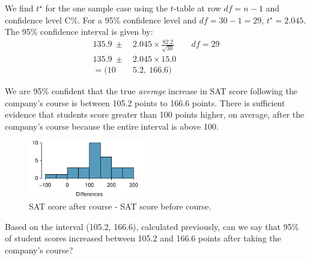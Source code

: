 \begin{examplewrap}
\begin{nexample}
\begin{description}
We find $t^{\star}$ for the one sample case using the $t$-table at row $df = n -1$ and confidence level C\%.  For a 95\% confidence level and $df = 30 - 1 = 29$, $t^{\star} = 2.045$.\\

The 95\% confidence interval is given by:
\begin{align*}
135.9 \ \pm\  &2.045\times  \frac{82.2}{\sqrt{30}}  \qquad df = 29\\
135.9 \ \pm\  &2.045\times 15.0 \\
=(10&5.2,\ 166.6)
\end{align*}
\item[\inferencestep{Conclude}]  We are 95\% confident that the true \emph{average} increase in SAT score following the company's course is between 105.2 points to 166.6 points.  There is sufficient evidence that students score greater than 100 points higher, on average, after the company's course because the entire interval is above 100.  
\end{description}
\end{nexample}
\end{examplewrap}


\begin{figure}
\centering
\includegraphics[width=0.45\textwidth]{ch_inference_for_means/figures/satImprovementHTDataHistogram/satImprovementHTDataHistogram}
\caption{SAT score after course - SAT score before course. }
\label{satImprovementHTDataHistogram3}
\end{figure}


\begin{exercisewrap}
\begin{nexercise}
Based on the interval (105.2, 166.6), calculated previously, can we say that 95\% of student scores increased between 105.2 and 166.6 points after taking the company's course?  


\end{nexercise}
\end{exercisewrap}


